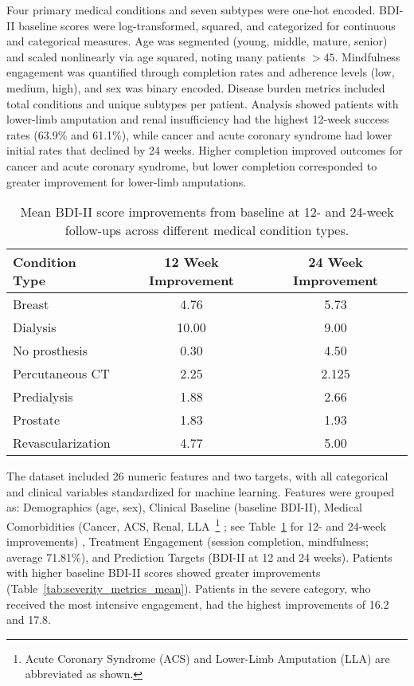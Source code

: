\documentclass[conference]{IEEEtran}
\begin{document}
Four primary medical conditions and seven subtypes were one-hot encoded. BDI-II baseline scores were log-transformed, squared, and categorized for continuous and categorical measures. Age was segmented (young, middle, mature, senior) and scaled nonlinearly via age squared, noting many patients $>45$. Mindfulness engagement was quantified through completion rates and adherence levels (low, medium, high), and sex was binary encoded. Disease burden metrics included total conditions and unique subtypes per patient. Analysis showed patients with lower-limb amputation and renal insufficiency had the highest 12-week success rates (63.9\% and 61.1\%), while cancer and acute coronary syndrome had lower initial rates that declined by 24 weeks. Higher completion improved outcomes for cancer and acute coronary syndrome, but lower completion corresponded to greater improvement for lower-limb amputations.




\begin{table}[ht]
\centering
\caption{Mean BDI-II score improvements from baseline at 12- and 24-week follow-ups across different medical condition types.}
\begin{tabularx}{\linewidth}{|X|c|c|}
\hline
\textbf{Condition Type} & \textbf{12 Week Improvement} & \textbf{24 Week Improvement} \\
\hline
Breast & 4.76 & 5.73 \\ 
Dialysis & 10.00 & 9.00 \\ 
No prosthesis & 0.30 & 4.50 \\ 
Percutaneous CT & 2.25 & 2.125 \\ 
Predialysis & 1.88 & 2.66 \\ 
Prostate & 1.83 & 1.93 \\ 
Revascularization & 4.77 & 5.00 \\ 
\hline
\end{tabularx}
\label{tab:bdii_improvement}
\end{table}


The dataset included 26 numeric features and two targets, with all categorical and clinical variables standardized for machine learning. Features were grouped as: Demographics (age, sex), Clinical Baseline (baseline BDI-II), Medical Comorbidities (Cancer, ACS, Renal, LLA~\footnote{Acute Coronary Syndrome (ACS) and Lower-Limb Amputation (LLA) are abbreviated as shown.} ; see Table~\ref{tab:bdii_improvement} for 12- and 24-week improvements) , Treatment Engagement (session completion, mindfulness; average 71.81\%), and Prediction Targets (BDI-II at 12 and 24 weeks). Patients with higher baseline BDI-II scores showed greater improvements (Table~\ref{tab:severity_metrics_mean}). Patients in the severe category, who received the most intensive engagement, had the highest improvements of 16.2 and 17.8.
\end{document}
